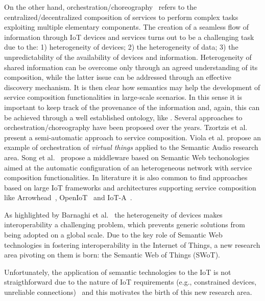 On the other hand, orchestration/choreography~\cite{dar2011adaptable} refers to the centralized/decentralized composition of services to perform complex tasks exploiting multiple elementary components. The creation of a seamless flow of information through IoT devices and services turns out to be a challenging task due to the: 1) heterogeneity of devices; 2) the heterogeneity of data; 3) the unpredictability of the availability of devices and information. Heterogeneity of shared information can be overcome only through an agreed understanding of its composition, while the latter issue can be addressed through an effective discovery mechanism. It is then clear how semantics may help the development of service composition functionalities in large-scale scenarios. In this sense it is important to keep track of the provenance of the information and, again, this can be achieved through a well established ontology, like . Several approaches to orchestration/choreography have been proposed over the years. Tzortzis et al. \cite{Tzortzis2016ASA} present a semi-automatic approach to service composition. Viola et al. \cite{viola2018playsound} propose an example of orchestration of \textit{virtual things} applied to the Semantic Audio research area. Song et al.~\cite{song2010semantic} propose a middleware based on Semantic Web techonologies aimed at the automatic configuration of an heterogeneous network with service composition functionalities. In literature it is also common to find approaches based on large IoT frameworks and architectures supporting service composition like Arrowhead~\cite{delsing2017iot}, OpenIoT~\cite{jayaraman2015addressing} and IoT-A~\cite{bassi2013enabling}.

As highlighted by Barnaghi et al.~\mbox{\cite{barnaghi2012semantics}} the heterogeneity of devices makes interoperability a challenging problem, which prevents generic solutions  from  being  adopted on a global scale. Due to the key role of Semantic Web technologies in fostering interoperability in the Internet of Things, a new research area pivoting on them is born: the Semantic Web of Things (SWoT). 

Unfortunately, the application of semantic technologies to the IoT is not straigthforward due to the nature of IoT requirements (e.g., constrained devices, unreliable connections)~\cite{barnaghi2012semantics} and this motivates the birth of this new research area.

